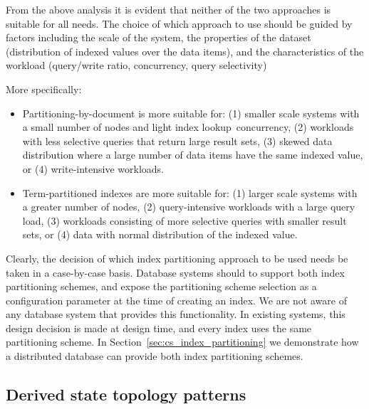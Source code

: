 From the above analysis it is evident that neither of the two approaches is suitable for all needs.
The choice of which approach to use should be guided by factors including the scale of the system,
the properties of the dataset (distribution of indexed values over the data items),
and the characteristics of the workload (query/write ratio, concurrency, query selectivity)

More specifically:
\begin{itemize}

  \item Partitioning-by-document is more suitable for:
  (1) smaller scale systems with a small number of nodes and light index lookup concurrency,
  (2) workloads with less selective queries that return large result sets,
  (3) skewed data distribution where a large number of data items have the same indexed value,
  or (4) write-intensive workloads.

  \item Term-partitioned indexes are more suitable for:
  (1) larger scale systems with a greater number of nodes,
  (2) query-intensive workloads with a large query load,
  (3) workloads consisting of more selective queries with smaller result sets,
  or (4) data with normal distribution of the indexed value.

\end{itemize}

Clearly, the decision of which index partitioning approach to be used needs be taken in a case-by-case basis.
Database systems should to support both index partitioning schemes, and expose the partitioning scheme selection as a
configuration parameter at the time of creating an index.
We are not aware of any database system that provides this functionality.
In existing systems, this design decision is made at design time, and every index uses the same partitioning scheme.
\cite{kejriwal:slik, tan:diffindex, riakv:secondaryindexes, cassandra:secondaryindexing}
In Section~\ref{sec:cs_index_partitioning} we demonstrate how a distributed database can provide both index partitioning
schemes.


\subsection{Derived state topology patterns}
\label{sec:topology_patterns}

